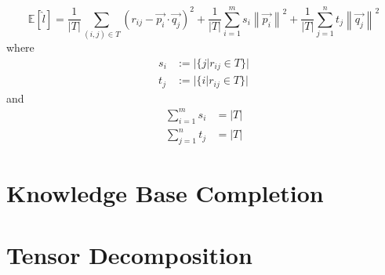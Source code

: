 \documentclass[11pt, english]{article}
\newcommand\norm[1]{\left\lVert#1\right\rVert}
\begin{document}
 \begin{equation}
     \mathbb{E}[\hat{l}]=\frac{1}{|T|}\sum\limits_{(i,j)\in T}(r_{ij}-\vec{p_{i}}\cdot\vec{q_{j}})^2+\frac{1}{|T|}\sum\limits_{i=1}^{m} s_i\norm{\vec{p_i}}^2+\frac{1}{|T|}\sum\limits_{j=1}^{n} t_j\norm{\vec{q_{j}}}^2
 \end{equation}
 where
 \begin{align}
      s_i &:=  |\{j|r_{ij}\in T\}| \\
      t_j  &:=  |\{i|r_{ij} \in T\}|
 \end{align}
 and 
 \begin{align}
     \sum\limits_{i=1}^{m} s_i &= |T|  \\
     \sum\limits_{j=1}^{n} t_j &= |T|
 \end{align}

\section{Knowledge Base Completion}

\section{Tensor Decomposition}



\end{document}
